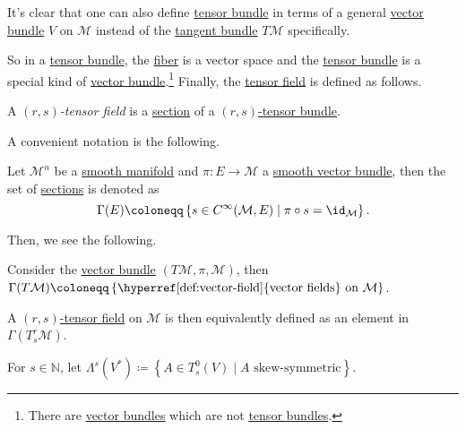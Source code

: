 \begin{remark}
	It's clear that one can also define \hyperref[def:tensor-bundle]{tensor bundle} in terms of a general \hyperref[def:vector-bundle]{vector bundle} \(V\) on \(\mathcal{M} \) instead of the \hyperref[def:tangent-bundle]{tangent bundle} \(T \mathcal{M} \) specifically.
\end{remark}

So in a \hyperref[def:tensor-bundle]{tensor bundle}, the \hyperref[def:fiber]{fiber} is a vector space and the \hyperref[def:tensor-bundle]{tensor bundle} is a special kind of \hyperref[def:vector-bundle]{vector bundle}.\footnote{There are \hyperref[def:vector-bundle]{vector bundles} which are not \hyperref[def:tensor-bundle]{tensor bundles}.} Finally, the \hyperref[def:tensor-field]{tensor field} is defined as follows.

\begin{definition}\label{def:tensor-field}
	A \emph{\((r, s)\)-tensor field} is a \hyperref[def:section]{section} of a \hyperref[def:tensor-bundle]{\((r, s)\)-tensor bundle}.
\end{definition}

A convenient notation is the following.

\begin{notation}
	Let \(\mathcal{M} ^n \) be a \hyperref[def:smooth-manifold]{smooth manifold} and \(\pi \colon E \to \mathcal{M} \) a \hyperref[def:vector-bundle]{smooth vector bundle}, then the set of \hyperref[def:section]{sections} is denoted as
	\[
		\Gamma (E) \coloneqq \left\{ s\in C^{\infty} (\mathcal{M} , E) \mid \pi \circ s = \id_{\mathcal{M} } \right\}.
	\]
\end{notation}

Then, we see the following.

\begin{eg}
	Consider the \hyperref[def:vector-bundle]{vector bundle} \((T\mathcal{M} , \pi , \mathcal{M} )\), then \(\Gamma (T\mathcal{M} ) \coloneqq \left\{ \text{\hyperref[def:vector-field]{vector fields} on } \mathcal{M} \right\} \).
\end{eg}

\begin{eg}
	A \hyperref[def:tensor-field]{\((r, s)\)-tensor field} on \(\mathcal{M} \) is then equivalently defined as an element in \(\Gamma (T_s^r \mathcal{M} )\).
\end{eg}

\begin{notation}
	For \(s\in \mathbb{N} \), let \(\Lambda ^s(V^{\ast} ) \coloneqq \left\{ A\in T_s^0(V) \mid A \text{ skew-symmetric} \right\} \).
\end{notation}

